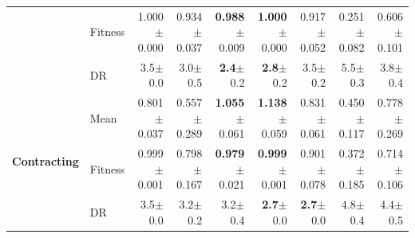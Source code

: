 \begin{table}[t]
{\begin{tabular}{ll||r|rrrrrr}
 & Fitness & \cellcolor[HTML]{F2CF80} 1.000{\scriptsize\color{black!75}$\pm$0.000} & 0.934{\scriptsize\color{black!75}$\pm$0.037} & \textbf{0.988}{\scriptsize\color{black!75}$\pm$0.009} & \textbf{1.000}{\scriptsize\color{black!75}$\pm$0.000} & 0.917{\scriptsize\color{black!75}$\pm$0.052} & \textcolor{black!75}{0.251}{\scriptsize\color{black!75}$\pm$0.082} & \textcolor{black!75}{0.606}{\scriptsize\color{black!75}$\pm$0.101} \\
 & DR & 3.5{\scriptsize\color{black!75}$\pm$0.0} & 3.0{\scriptsize\color{black!75}$\pm$0.5} & \textbf{2.4}{\scriptsize\color{black!75}$\pm$0.2} & \textbf{2.8}{\scriptsize\color{black!75}$\pm$0.2} & 3.5{\scriptsize\color{black!75}$\pm$0.2} & \textcolor{black!75}{5.5}{\scriptsize\color{black!75}$\pm$0.3} & \textcolor{black!75}{3.8}{\scriptsize\color{black!75}$\pm$0.4} \\
\midrule
\multirow{3}{*}{\textbf{Contracting}} & Mean & \cellcolor[HTML]{F8E2B2} 0.801{\scriptsize\color{black!75}$\pm$0.037} & \textcolor{black!75}{0.557}{\scriptsize\color{black!75}$\pm$0.289} & \textbf{1.055}{\scriptsize\color{black!75}$\pm$0.061} & \textbf{1.138}{\scriptsize\color{black!75}$\pm$0.059} & 0.831{\scriptsize\color{black!75}$\pm$0.061} & \textcolor{black!75}{0.450}{\scriptsize\color{black!75}$\pm$0.117} & 0.778{\scriptsize\color{black!75}$\pm$0.269} \\
 & Fitness & \cellcolor[HTML]{F2CF80} 0.999{\scriptsize\color{black!75}$\pm$0.001} & 0.798{\scriptsize\color{black!75}$\pm$0.167} & \textbf{0.979}{\scriptsize\color{black!75}$\pm$0.021} & \textbf{0.999}{\scriptsize\color{black!75}$\pm$0.001} & 0.901{\scriptsize\color{black!75}$\pm$0.078} & \textcolor{black!75}{0.372}{\scriptsize\color{black!75}$\pm$0.185} & \textcolor{black!75}{0.714}{\scriptsize\color{black!75}$\pm$0.106} \\
 & DR & 3.5{\scriptsize\color{black!75}$\pm$0.0} & 3.2{\scriptsize\color{black!75}$\pm$0.2} & 3.2{\scriptsize\color{black!75}$\pm$0.4} & \textbf{2.7}{\scriptsize\color{black!75}$\pm$0.0} & \textbf{2.7}{\scriptsize\color{black!75}$\pm$0.0} & \textcolor{black!75}{4.8}{\scriptsize\color{black!75}$\pm$0.4} & \textcolor{black!75}{4.4}{\scriptsize\color{black!75}$\pm$0.5} \\
\bottomrule
\end{tabular}
}
\end{table}
